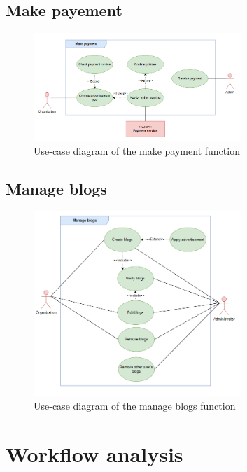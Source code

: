 
\subsection{Make payement}

\begin {figure}[H]
\centering
\includegraphics[width=0.7\textwidth]{Figures/payment_ucd.png}
\caption{Use-case diagram of the make payment function}
\label{fig:payment-activity-diagram}
\end{figure}




\subsection{Manage blogs}

\begin {figure}[H]
\centering
\includegraphics[width=0.7\textwidth]{Figures/manage_blog_ucd.png}
\caption{Use-case diagram of the manage blogs function}
\label{fig:manage-blog-activity-diagram}
\end{figure}



\section{Workflow analysis}

